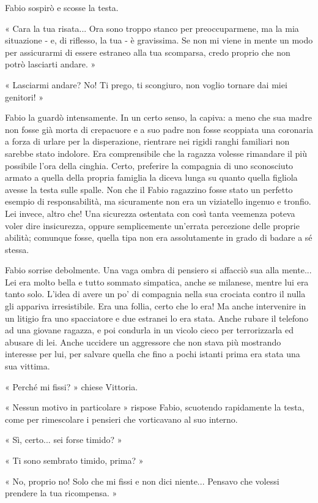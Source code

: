 Fabio sospirò e scosse la testa.

« Cara la tua risata... Ora sono troppo stanco per preoccuparmene, ma la mia situazione - e, di riflesso, la tua - è gravissima. Se non mi viene in mente un modo per assicurarmi di essere estraneo alla tua scomparsa, credo proprio che non potrò lasciarti andare. »

« Lasciarmi andare? No! Ti prego, ti scongiuro, non voglio tornare dai miei genitori! »

Fabio la guardò intensamente. In un certo senso, la capiva: a meno che sua madre non fosse già morta di crepacuore e a suo padre non fosse scoppiata una coronaria a forza di urlare per la disperazione, rientrare nei rigidi ranghi familiari non sarebbe stato indolore. Era comprensibile che la ragazza volesse rimandare il più possibile l'ora della cinghia. Certo, preferire la compagnia di uno sconosciuto armato a quella della propria famiglia la diceva lunga su quanto quella figliola avesse la testa sulle spalle. Non che il Fabio ragazzino fosse stato un perfetto esempio di responsabilità, ma sicuramente non era un viziatello ingenuo e tronfio. Lei invece, altro che! Una sicurezza ostentata con così tanta veemenza poteva voler dire insicurezza, oppure semplicemente un'errata percezione delle proprie abilità; comunque fosse, quella tipa non era assolutamente in grado di badare a sé stessa.

Fabio sorrise debolmente. Una vaga ombra di pensiero si affacciò sua alla mente... Lei era molto bella e tutto sommato simpatica, anche se milanese, mentre lui era tanto solo. L'idea di avere un po' di compagnia nella sua crociata contro il nulla gli appariva irresistibile. Era una follia, certo che lo era! Ma anche intervenire in un litigio fra uno spacciatore e due estranei lo era stata. Anche rubare il telefono ad una giovane ragazza, e poi condurla in un vicolo cieco per terrorizzarla ed abusare di lei. Anche uccidere un aggressore che non stava più mostrando interesse per lui, per salvare quella che fino a pochi istanti prima era stata una sua vittima.

« Perché mi fissi? » chiese Vittoria.

« Nessun motivo in particolare » rispose Fabio, scuotendo rapidamente la testa, come per rimescolare i pensieri che vorticavano al suo interno.

« Sì, certo... sei forse timido? »

« Ti sono sembrato timido, prima? »

« No, proprio no! Solo che mi fissi e non dici niente... Pensavo che volessi prendere la tua ricompensa. »

